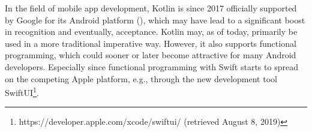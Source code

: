 In the field of mobile app development, Kotlin is since 2017 officially supported by Google for its Android platform (\cite{cleron_android_2017}), which may have lead to a significant boost in recognition and eventually, acceptance. Kotlin may, as of today, primarily be used in a more traditional imperative way. However, it also supports functional programming, which could sooner or later become attractive for many Android developers. Especially since functional programming with Swift starts to spread on the competing Apple platform, e.g., through the new development tool SwiftUI\footnote{https://developer.apple.com/xcode/swiftui/ (retrieved August 8, 2019)}.
